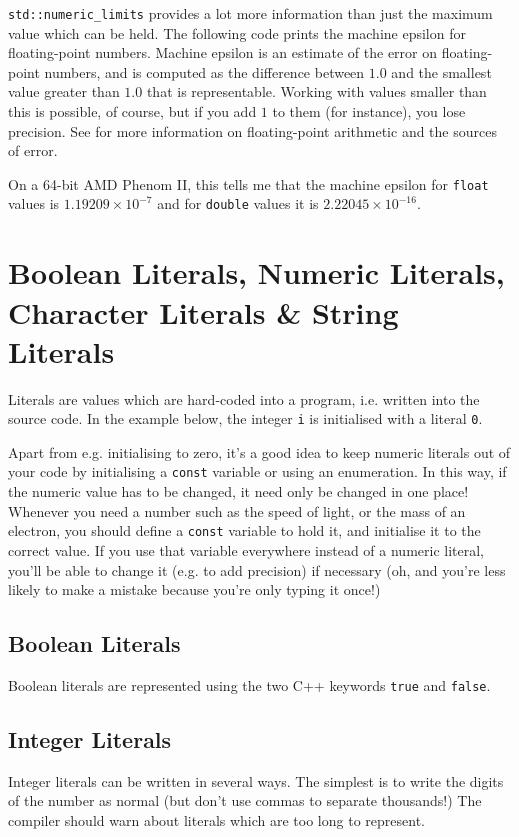 \documentclass[a4paper]{scrartcl}
\begin{document}
\texttt{std::numeric\_limits} provides a lot more information than just the maximum value which can be held. The following code prints the machine epsilon for floating-point numbers. Machine epsilon is an estimate of the error on floating-point numbers, and is computed as the difference between $1.0$ and the smallest value greater than $1.0$ that is representable. Working with values smaller than this is possible, of course, but if you add $1$ to them (for instance), you lose precision. See \cite{Goldberg1991} for more information on floating-point arithmetic and the sources of error.



On a 64-bit AMD Phenom II, this tells me that the machine epsilon for \texttt{float} values is $1.19209\times 10^{-7}$ and for \texttt{double} values it is $2.22045\times 10^{-16}$.

\section{Boolean Literals, Numeric Literals, Character Literals \& String Literals}
Literals are values which are hard-coded into a program, i.e. written into the source code. In the example below, the integer \texttt{i} is initialised with a literal \texttt{0}.



Apart from e.g. initialising to zero, it's a good idea to keep numeric literals out of your code by initialising a \texttt{const} variable or using an enumeration. In this way, if the numeric value has to be changed, it need only be changed in one place! Whenever you need a number such as the speed of light, or the mass of an electron, you should define a \texttt{const} variable to hold it, and initialise it to the correct value. If you use that variable everywhere instead of a numeric literal, you'll be able to change it (e.g. to add precision) if necessary (oh, and you're less likely to make a mistake because you're only typing it once!)

\subsection{Boolean Literals}
Boolean literals are represented using the two C++ keywords \texttt{true} and \texttt{false}.

\subsection{Integer Literals}
Integer literals can be written in several ways. The simplest is to write the digits of the number as normal (but don't use commas to separate thousands!) The compiler should warn about literals which are too long to represent.
\end{document}
